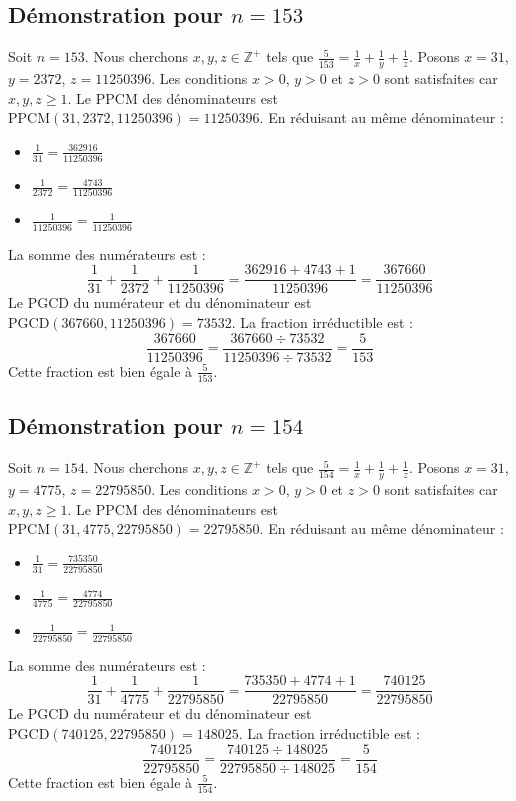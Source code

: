 \documentclass[11pt,a4paper]{article}
\begin{document}
\subsection{Démonstration pour $n = 153$}
Soit $n = 153$. Nous cherchons $x, y, z \in \mathbb{Z}^{+}$ tels que $\frac{5}{153} = \frac{1}{x} + \frac{1}{y} + \frac{1}{z}$.
Posons $x = 31$, $y = 2372$, $z = 11250396$.
Les conditions $x > 0$, $y > 0$ et $z > 0$ sont satisfaites car $x, y, z \geq 1$.
Le PPCM des dénominateurs est $\text{PPCM}(31, 2372, 11250396) = 11250396$.
En réduisant au même dénominateur :
\begin{itemize}
    \item $\frac{1}{31} = \frac{362916}{11250396}$
    \item $\frac{1}{2372} = \frac{4743}{11250396}$
    \item $\frac{1}{11250396} = \frac{1}{11250396}$
\end{itemize}
La somme des numérateurs est :
$$ \frac{1}{31} + \frac{1}{2372} + \frac{1}{11250396} = \frac{362916 + 4743 + 1}{11250396} = \frac{367660}{11250396} $$
Le PGCD du numérateur et du dénominateur est $\text{PGCD}(367660, 11250396) = 73532$.
La fraction irréductible est :
$$ \frac{367660}{11250396} = \frac{367660 \div 73532}{11250396 \div 73532} = \frac{5}{153} $$
Cette fraction est bien égale à $\frac{5}{153}$.

\subsection{Démonstration pour $n = 154$}
Soit $n = 154$. Nous cherchons $x, y, z \in \mathbb{Z}^{+}$ tels que $\frac{5}{154} = \frac{1}{x} + \frac{1}{y} + \frac{1}{z}$.
Posons $x = 31$, $y = 4775$, $z = 22795850$.
Les conditions $x > 0$, $y > 0$ et $z > 0$ sont satisfaites car $x, y, z \geq 1$.
Le PPCM des dénominateurs est $\text{PPCM}(31, 4775, 22795850) = 22795850$.
En réduisant au même dénominateur :
\begin{itemize}
    \item $\frac{1}{31} = \frac{735350}{22795850}$
    \item $\frac{1}{4775} = \frac{4774}{22795850}$
    \item $\frac{1}{22795850} = \frac{1}{22795850}$
\end{itemize}
La somme des numérateurs est :
$$ \frac{1}{31} + \frac{1}{4775} + \frac{1}{22795850} = \frac{735350 + 4774 + 1}{22795850} = \frac{740125}{22795850} $$
Le PGCD du numérateur et du dénominateur est $\text{PGCD}(740125, 22795850) = 148025$.
La fraction irréductible est :
$$ \frac{740125}{22795850} = \frac{740125 \div 148025}{22795850 \div 148025} = \frac{5}{154} $$
Cette fraction est bien égale à $\frac{5}{154}$.
\end{document}
